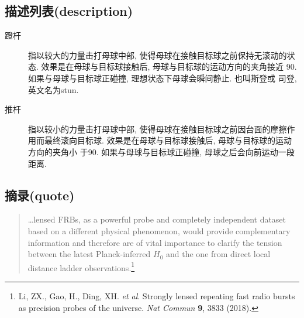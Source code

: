 \documentclass{ctexart}
\begin{document}
    \subsection{描述列表(description)}
    \begin{description}
        \item[蹬杆] 指以较大的力量击打母球中部, 使得母球在接触目标球之前保持无滚动的状
        态. 效果是在母球与目标球接触后, 母球与目标球的运动方向的夹角接近
        90\textdegree.如果与母球与目标球正碰撞, 理想状态下母球会瞬间静止. 也叫斯登或
        司登, 英文名为stun. 
        \item[推杆] 指以较小的力量击打母球中部, 使得母球在接触目标球之前因台面的摩擦作
        用而最终滚向目标球. 效果是在母球与目标球接触后, 母球与目标球的运动方向的夹角小
        于90\textdegree. 如果与母球与目标球正碰撞, 母球之后会向前运动一段距离. 
    \end{description}
    \subsection{摘录(quote)}
    \begin{quote}
        \dots lensed FRBs, as a powerful probe and completely independent
        dataset based on a different physical phenomenon, would provide
        complementary information and therefore are of vital importance to
        clarify the tension between the latest Planck-inferred $H_0$ and the
        one from direct local distance ladder observations.\footnote{
            Li, ZX., Gao, H., Ding, XH. \textit{et al}. Strongly lensed
            repeating fast radio bursts as precision probes of the universe.
            \textit{Nat Commun} \textbf{9}, 3833 (2018).}
    \end{quote}
\end{document}
